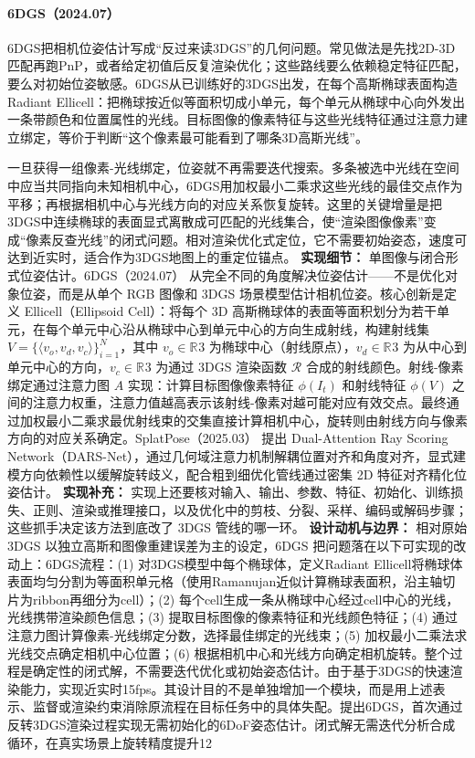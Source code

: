 \paragraph{6DGS（2024.07）\cite{2407_15484}}
6DGS把相机位姿估计写成“反过来读3DGS”的几何问题。常见做法是先找2D-3D匹配再跑PnP，或者给定初值后反复渲染优化；这些路线要么依赖稳定特征匹配，要么对初始位姿敏感。6DGS从已训练好的3DGS出发，在每个高斯椭球表面构造Radiant Ellicell：把椭球按近似等面积切成小单元，每个单元从椭球中心向外发出一条带颜色和位置属性的光线。目标图像的像素特征与这些光线特征通过注意力建立绑定，等价于判断“这个像素最可能看到了哪条3D高斯光线”。

一旦获得一组像素-光线绑定，位姿就不再需要迭代搜索。多条被选中光线在空间中应当共同指向未知相机中心，6DGS用加权最小二乘求这些光线的最佳交点作为平移；再根据相机中心与光线方向的对应关系恢复旋转。这里的关键增量是把3DGS中连续椭球的表面显式离散成可匹配的光线集合，使“渲染图像像素”变成“像素反查光线”的闭式问题。相对渲染优化式定位，它不需要初始姿态，速度可达到近实时，适合作为3DGS地图上的重定位锚点。
\textbf{实现细节：} 单图像与闭合形式位姿估计。6DGS（2024.07） 从完全不同的角度解决位姿估计——不是优化对象位姿，而是从单个 RGB 图像和 3DGS 场景模型估计相机位姿。核心创新是定义 Ellicell（Ellipsoid Cell）：将每个 3D 高斯椭球体的表面等面积划分为若干单元，在每个单元中心沿从椭球中心到单元中心的方向生成射线，构建射线集 $V = \{\langle v_o, v_d, v_c \rangle\}_{i=1}^N$，其中 $v_o \in \mathbb{R}^{}3$ 为椭球中心（射线原点），$v_d \in \mathbb{R}^{}3$ 为从中心到单元中心的方向，$v_c \in \mathbb{R}^{}3$ 为通过 3DGS 渲染函数 $\mathcal{R}$ 合成的射线颜色。射线-像素绑定通过注意力图 $A$ 实现：计算目标图像像素特征 $\phi(I_t)$ 和射线特征 $\phi(V)$ 之间的注意力权重，注意力值越高表示该射线-像素对越可能对应有效交点。最终通过加权最小二乘求最优射线束的交集直接计算相机中心，旋转则由射线方向与像素方向的对应关系确定。SplatPose（2025.03） 提出 Dual-Attention Ray Scoring Network（DARS-Net），通过几何域注意力机制解耦位置对齐和角度对齐，显式建模方向依赖性以缓解旋转歧义，配合粗到细优化管线通过密集 2D 特征对齐精化位姿估计。
\textbf{实现补充：} 实现上还要核对输入、输出、参数、特征、初始化、训练损失、正则、渲染或推理接口，以及优化中的剪枝、分裂、采样、编码或解码步骤；这些抓手决定该方法到底改了 3DGS 管线的哪一环。
\textbf{设计动机与边界：} 相对原始 3DGS 以独立高斯和图像重建误差为主的设定，6DGS 把问题落在以下可实现的改动上：6DGS流程：(1) 对3DGS模型中每个椭球体，定义Radiant Ellicell将椭球体表面均匀分割为等面积单元格（使用Ramanujan近似计算椭球表面积，沿主轴切片为ribbon再细分为cell）；(2) 每个cell生成一条从椭球中心经过cell中心的光线，光线携带渲染颜色信息；(3) 提取目标图像的像素特征和光线颜色特征；(4) 通过注意力图计算像素-光线绑定分数，选择最佳绑定的光线束；(5) 加权最小二乘法求光线交点确定相机中心位置；(6) 根据相机中心和光线方向确定相机旋转。整个过程是确定性的闭式解，不需要迭代优化或初始姿态估计。由于基于3DGS的快速渲染能力，实现近实时15fps。其设计目的不是单独增加一个模块，而是用上述表示、监督或渲染约束消除原流程在目标任务中的具体失配。提出6DGS，首次通过反转3DGS渲染过程实现无需初始化的6DoF姿态估计。闭式解无需迭代分析合成循环，在真实场景上旋转精度提升12%
